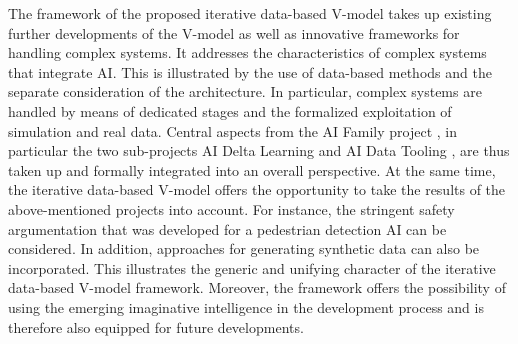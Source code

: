 The framework of the proposed iterative data-based V-model takes up existing further developments of the V-model \cite{VVMOverall} as well as innovative frameworks \cite{favaro2023building, karpathy_cvpr21} for handling complex systems. It addresses the characteristics of complex systems that integrate AI. This is illustrated by the use of data-based methods and the separate consideration of the architecture. In particular, complex systems are handled by means of dedicated stages and the formalized exploitation of simulation and real data. Central aspects from the AI Family project \cite{KIFamilie}, in particular the two sub-projects AI Delta Learning \cite{KIDeltaSynData} and AI Data Tooling \cite{KIDataTooling}, are thus taken up and formally integrated into an overall perspective. At the same time, the iterative data-based V-model offers the opportunity to take the results of the above-mentioned projects \cite{KIFamilie, KIDeltaSynData, KIDataTooling} into account. For instance, the stringent safety argumentation that was developed for a pedestrian detection AI \cite{KIAbsicherungSynMethoden, KIAbsicherungSynAbsicherung} can be considered. In addition, approaches for generating synthetic data \cite{KIAbsicherungSynData, KIDeltaSynData} can also be incorporated. This illustrates the generic and unifying character of the iterative data-based V-model framework. Moreover, the framework offers the possibility of using the emerging imaginative intelligence \cite{wang2024does, li2024sora} in the development process and is therefore also equipped for future developments.

